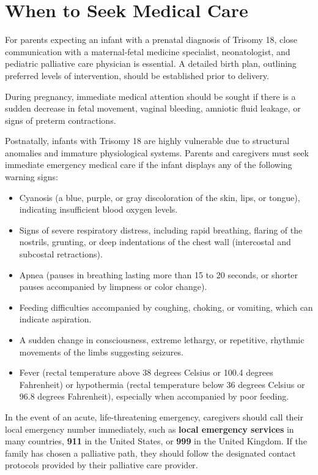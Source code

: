 \section*{When to Seek Medical Care}
For parents expecting an infant with a prenatal diagnosis of Trisomy 18, close communication with a maternal-fetal medicine specialist, neonatologist, and pediatric palliative care physician is essential. A detailed birth plan, outlining preferred levels of intervention, should be established prior to delivery.

During pregnancy, immediate medical attention should be sought if there is a sudden decrease in fetal movement, vaginal bleeding, amniotic fluid leakage, or signs of preterm contractions.

Postnatally, infants with Trisomy 18 are highly vulnerable due to structural anomalies and immature physiological systems. Parents and caregivers must seek immediate emergency medical care if the infant displays any of the following warning signs:
\begin{itemize}
    \item Cyanosis (a blue, purple, or gray discoloration of the skin, lips, or tongue), indicating insufficient blood oxygen levels.
    \item Signs of severe respiratory distress, including rapid breathing, flaring of the nostrils, grunting, or deep indentations of the chest wall (intercostal and subcostal retractions).
    \item Apnea (pauses in breathing lasting more than 15 to 20 seconds, or shorter pauses accompanied by limpness or color change).
    \item Feeding difficulties accompanied by coughing, choking, or vomiting, which can indicate aspiration.
    \item A sudden change in consciousness, extreme lethargy, or repetitive, rhythmic movements of the limbs suggesting seizures.
    \item Fever (rectal temperature above 38 degrees Celsius or 100.4 degrees Fahrenheit) or hypothermia (rectal temperature below 36 degrees Celsius or 96.8 degrees Fahrenheit), especially when accompanied by poor feeding.
\end{itemize}

In the event of an acute, life-threatening emergency, caregivers should call their local emergency number immediately, such as \textbf{local emergency services} in many countries, \textbf{911} in the United States, or \textbf{999} in the United Kingdom. If the family has chosen a palliative path, they should follow the designated contact protocols provided by their palliative care provider.

